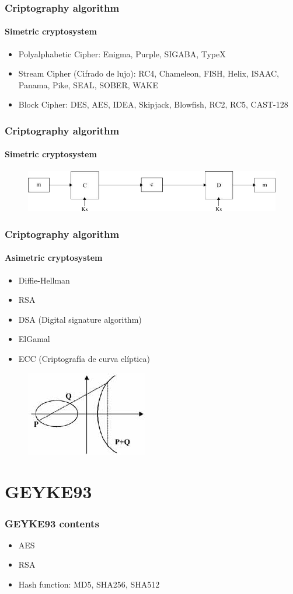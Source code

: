 \documentclass{beamer}
\begin{document}
\begin{frame}
\frametitle{Criptography algorithm}
\framesubtitle{Simetric cryptosystem}
\begin{itemize}
\item Polyalphabetic Cipher: Enigma, Purple, SIGABA, TypeX
\item Stream Cipher (Cifrado de lujo): RC4, Chameleon, FISH, Helix, ISAAC, Panama, Pike, SEAL, SOBER, WAKE
\item Block Cipher: DES, AES, IDEA, Skipjack, Blowfish, RC2, RC5, CAST-128
\end{itemize}
\end{frame}

\begin{frame}
\frametitle{Criptography algorithm}
\framesubtitle{Simetric cryptosystem}
\begin{figure}
\includegraphics[width=0.8\linewidth]{cp.png}
\end{figure}
\end{frame}

\begin{frame}
\frametitle{Criptography algorithm}
\framesubtitle{Asimetric cryptosystem}
\begin{itemize}
\item Diffie-Hellman
\item RSA
\item DSA (Digital signature algorithm)
\item ElGamal
\item ECC (Criptografía de curva elíptica)
\end{itemize}
\begin{figure}
\includegraphics[width=0.4\linewidth]{ecc.png}
\end{figure}
\end{frame}

\section{GEYKE93}
\begin{frame}
\frametitle{GEYKE93 contents}
\begin{itemize}
\item AES
\item RSA
\item Hash function: MD5, SHA256, SHA512
\end{itemize}
\end{frame}
\end{document}
